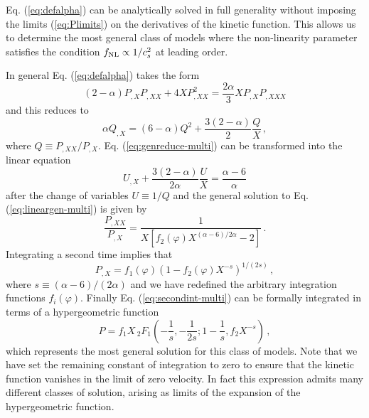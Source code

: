 {Eq. (\ref{eq:defalpha}) can be analytically solved in full 
generality without imposing the limits (\ref{eq:Plimits}) on the 
derivatives of the kinetic function. This allows us to determine the 
most general class of models where the non-linearity parameter 
satisfies the condition $f_{\mathrm{NL}} \propto 1/c_s^2$ at leading order. 

In general Eq. (\ref{eq:defalpha}) takes the form 
% 
\begin{equation}
\label{eq:genPXeqn-multi}
(2-\alpha ) P_{,X}P_{,XX} + 4XP^2_{,XX} = \frac{2\alpha }{3}
X P_{,X}P_{,XXX}
\end{equation}
% 
and this reduces to 
% 
\begin{equation}
\label{eq:genreduce-multi}
\alpha Q_{,X} = (6-\alpha ) Q^2 + \frac{3(2-\alpha )}{2} \frac{Q}{X} \, ,
\end{equation}
% 
where $Q \equiv P_{,XX}/P_{,X}$. 
Eq. (\ref{eq:genreduce-multi}) can be transformed into the 
linear equation
% 
\begin{equation}
\label{eq:lineargen-multi}
U_{,X}+ \frac{3(2-\alpha )}{2\alpha} \frac{U}{X} = \frac{\alpha -6}{\alpha}
\end{equation}
% 
after the change of variables $U \equiv 1/Q$
and the general solution to Eq. (\ref{eq:lineargen-multi}) is given by
%  
\begin{equation}
\label{eq:gensolnlinear-multi}
\frac{P_{,XX}}{P_{,X}} = \frac{1}{X\left[ f_2(\varphi) X^{(\alpha -6)/2\alpha}
-2 \right] } \, .
\end{equation}
% 
Integrating a second time implies that
% 
\begin{equation}
\label{eq:secondint-multi}
P_{,X} = f_1 (\varphi ) \left( 1- f_2(\varphi ) X^{-s} \right)^{1/(2s)}  \, ,
\end{equation}
% 
where $s \equiv (\alpha -6 )/(2 \alpha)$ and we have redefined 
the arbitrary integration functions $f_i(\varphi )$.  
Finally Eq. (\ref{eq:secondint-multi}) can be formally integrated 
in terms of a hypergeometric function
%  
\begin{equation}
 \label{eq:thirdint-multi}
 P= f_1X \,{_2}F_1 \left( -\frac{1}{s}, -\frac{1}{2s}; 1-\frac{1}{s}, f_2X^{-s}
\right)  \, ,
\end{equation}
%  
which represents the most general solution for this class of models. 
Note that we have set the
remaining constant of integration to zero to ensure 
that the kinetic function vanishes in the limit of
zero velocity. In fact this expression admits many 
different classes of solution, arising as limits
of the expansion of the hypergeometric function.


}
